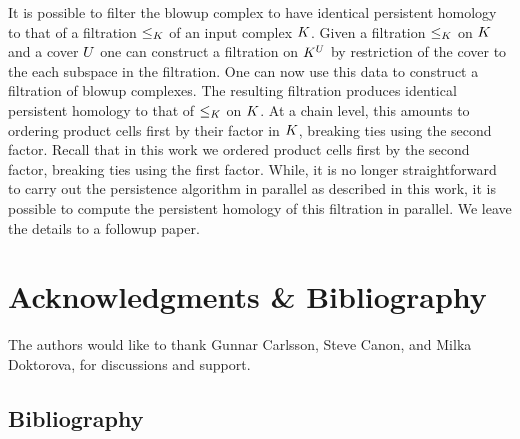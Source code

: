 \documentclass{elsarticle}
\begin{document}
It is possible to filter the blowup complex to have identical persistent homology 
to that of a filtration $\leq_{K}$ of an input complex $K$. 
Given a filtration $\leq_{K}$ on $K$ and a cover $U$
one can construct a filtration on $K^U$ by restriction of the cover to the 
each subspace in the filtration. One can now use this data to construct a filtration of 
blowup complexes. The resulting filtration produces identical persistent homology to that 
of $\leq_{K}$ on $K$. At a chain level, this amounts to ordering product cells first by their factor in $K$, breaking ties
using the second factor. Recall that in this work we ordered product cells first by the second factor, 
breaking ties using the first factor. While, it is no longer straightforward to carry out the 
persistence algorithm in parallel as described in this work, it is possible to compute the persistent homology
of this filtration in parallel. We leave the details to a followup paper.

\section*{Acknowledgments \& Bibliography}
The authors would like to thank Gunnar Carlsson, Steve Canon, and Milka Doktorova, for discussions and support.

\subsection*{Bibliography}
{ 
  \small 
  
   
}
\end{document}
